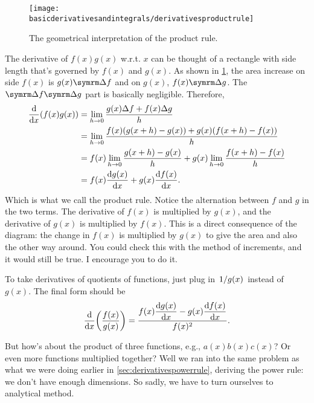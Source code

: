 \begin{figure}[h]
    \centering
    \texttt{[image: basicderivativesandintegrals/derivativesproductrule]}
    \caption{The geometrical interpretation of the product rule.}
    \label{fig:derivativesproductrule}
\end{figure}
The derivative of $f(x)g(x)$ w.r.t. $x$ can be thought of a rectangle with side length that's governed by $f(x)$ and $g(x)$. As shown in \cref{fig:derivativesproductrule}, the area increase on side $f(x)$ is $g(x)\Dd{f}$ and on $g(x)$, $f(x)\Dd{g}$. The $\Dd{f}\Dd{g}$ part is basically negligible. Therefore,
\begin{align*}
    \dv{x}(f(x)g(x)) &= \lim_{h \rightarrow 0}\frac{g(x)\Delta f + f(x)\Delta g}{h} \\
    &= \lim_{h \rightarrow 0}\frac{f(x)(g(x + h) - g(x)) + g(x)(f(x + h) - f(x))}{h} \\
    &= f(x)\lim_{h \rightarrow 0}\frac{g(x + h) - g(x)}{h} + g(x)\lim_{h \rightarrow 0}\frac{f(x + h) - f(x)}{h} \\
    &= f(x)\dv{g(x)}{x} + g(x)\dv{f(x)}{x}.
\end{align*}
Which is what we call the product rule. Notice the alternation between $f$ and $g$ in the two terms. The derivative of $f(x)$ is multiplied by $g(x)$, and the derivative of $g(x)$ is multiplied by $f(x)$. This is a direct consequence of the diagram: the change in $f(x)$ is multiplied by $g(x)$ to give the area and also the other way around. You could check this with the method of increments, and it would still be true. I encourage you to do it.

To take derivatives of quotients of functions, just plug in $\flatfrac{1}{g(x)}$ instead of $g(x)$. The final form should be
\begin{equation}
    \dv{x}(\frac{f(x)}{g(x)}) = \frac{\displaystyle f(x)\dv{g(x)}{x} - g(x)\dv{f(x)}{x}}{f(x)^2}.
\end{equation}

But how's about the product of three functions, e.g., $a(x)b(x)c(x)$? Or even more functions multiplied together? Well we ran into the same problem as what we were doing earlier in \cref{sec:derivativespowerrule}, deriving the power rule: we don't have enough dimensions. So sadly, we have to turn ourselves to analytical method.

